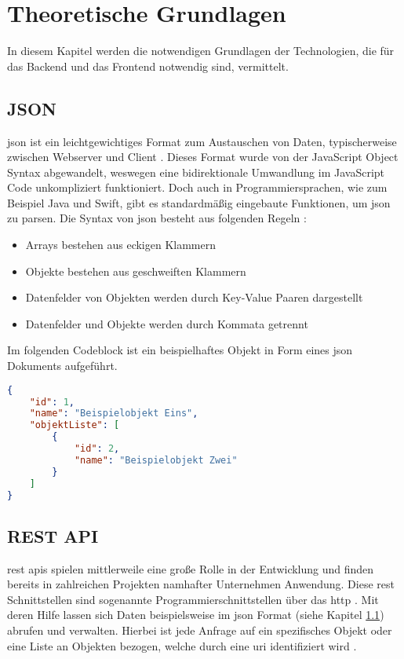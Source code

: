 \chapter{Theoretische Grundlagen}
In diesem Kapitel werden die notwendigen Grundlagen der Technologien, die für das Backend und das Frontend notwendig sind, vermittelt.

\section{JSON} \label{json}
\gls{json} ist ein leichtgewichtiges Format zum Austauschen von Daten, typischerweise zwischen Webserver und Client \cite[S.~23]{client-server-book}.
Dieses Format wurde von der JavaScript Object Syntax abgewandelt, weswegen eine bidirektionale Umwandlung im JavaScript Code unkompliziert funktioniert.
Doch auch in Programmiersprachen, wie zum Beispiel Java und Swift, gibt es standardmäßig eingebaute Funktionen, um \gls{json} zu parsen.
Die Syntax von \gls{json} besteht aus folgenden Regeln \cite[S.~23]{client-server-book}:

\begin{itemize}
	\item Arrays bestehen aus eckigen Klammern
	\item Objekte bestehen aus geschweiften Klammern
	\item Datenfelder von Objekten werden durch Key-Value Paaren dargestellt
	\item Datenfelder und Objekte werden durch Kommata getrennt
\end{itemize}

Im folgenden Codeblock ist ein beispielhaftes Objekt in Form eines \gls{json} Dokuments aufgeführt.
\begin{lstlisting}[language=Json]
{
	"id": 1,
	"name": "Beispielobjekt Eins",
	"objektListe": [
		{
			"id": 2,
			"name": "Beispielobjekt Zwei"
		}
	]
}
\end{lstlisting}

\clearpage

\section{REST API} \label{rest}
\gls{rest} \glspl{api} spielen mittlerweile eine große Rolle in der Entwicklung und finden bereits in zahlreichen Projekten namhafter Unternehmen Anwendung. Diese \gls{rest} Schnittstellen sind sogenannte Programmierschnittstellen über das \gls{http} \cite[S.~259]{client-server-book}. Mit deren Hilfe lassen sich Daten beispielsweise im \gls{json} Format (siehe Kapitel \ref{json}) abrufen und verwalten.
Hierbei ist jede Anfrage auf ein spezifisches Objekt oder eine Liste an Objekten bezogen, welche durch eine \gls{uri} identifiziert wird \cite[S.~259]{client-server-book}.

